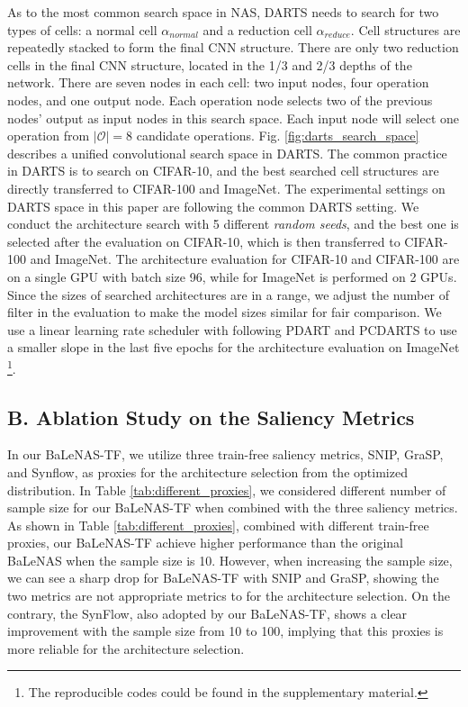 \documentclass[10pt,twocolumn,letterpaper]{article}
\begin{document}
As to the most common search space in NAS, DARTS needs to search for two types of cells: a normal cell $\alpha_{normal}$ and a reduction cell $\alpha_{reduce}$. Cell structures are repeatedly stacked to form the final CNN structure. There are only two reduction cells in the final CNN structure, located in the 1/3 and 2/3 depths of the network. There are seven nodes in each cell: two input nodes, four operation nodes, and one output node. Each operation node selects two of the previous nodes' output as input nodes in this search space. Each input node will select one operation from $|\mathcal{O}|=8$ candidate operations. Fig. \ref{fig:darts_search_space} describes a unified convolutional search space in DARTS. The common practice in DARTS is to search on CIFAR-10, and the best searched cell structures are directly transferred to CIFAR-100 and ImageNet. The experimental settings on DARTS space in this paper are following the common DARTS setting. We conduct the architecture search with 5 different \textit{random seeds}, and the best one is selected after the evaluation on CIFAR-10, which is then transferred to CIFAR-100 and ImageNet. The architecture evaluation for CIFAR-10 and CIFAR-100 are on a single GPU with batch size 96, while for ImageNet is performed on 2 GPUs. Since the sizes of searched architectures are in a range, we adjust the number of filter in the evaluation to make the model sizes similar for fair comparison. We use a linear learning rate scheduler with following PDART \cite{chen2019progressive} and PCDARTS \cite{xu2019pcdarts} to use a smaller slope in the last five epochs for the architecture evaluation on ImageNet \footnote{The reproducible codes could be found in the supplementary material. }.









\subsection*{B. Ablation Study on the Saliency Metrics} 
In our BaLeNAS-TF, we utilize three train-free saliency metrics, SNIP, GraSP, and Synflow, as proxies for the architecture selection from the optimized distribution. In Table \ref{tab:different_proxies}, we considered different number of sample size for our BaLeNAS-TF when combined with the three saliency metrics. As shown in Table \ref{tab:different_proxies}, combined with different train-free proxies, our BaLeNAS-TF achieve higher performance than the original BaLeNAS when the sample size is 10. However, when increasing the sample size, we can see a sharp drop for BaLeNAS-TF with SNIP and GraSP, showing the two metrics are not appropriate metrics to for the architecture selection. On the contrary, the SynFlow, also adopted by our BaLeNAS-TF, shows a clear improvement with the sample size from 10 to 100, implying that this proxies is more reliable for the architecture selection.
\end{document}
